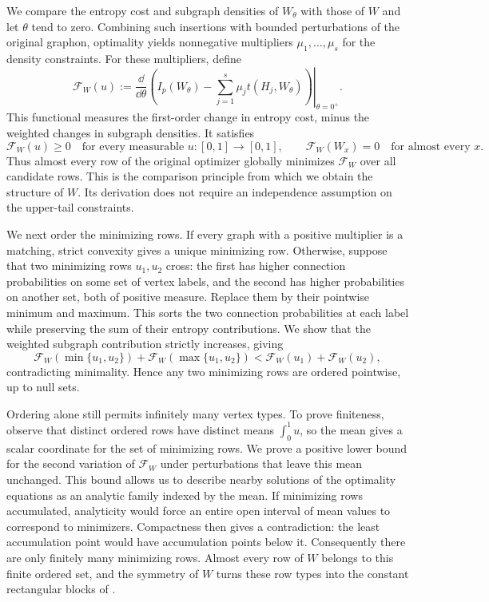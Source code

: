 We compare the entropy cost and subgraph densities of $W_\theta$ with
those of $W$ and let $\theta$ tend to zero. Combining such insertions
with bounded perturbations of the original graphon, optimality yields
nonnegative multipliers $\mu_1,\dots,\mu_s$ for the density constraints.
For these multipliers, define
\[
  \mathcal F_W(u):=\left.\frac{\dd}{\dd\theta}
  \left(I_p(W_\theta)-\sum_{j=1}^s\mu_j t(H_j,W_\theta)\right)
  \right|_{\theta=0^+}.
\]
This functional measures the first-order change in entropy cost,
minus the weighted changes in subgraph densities. It satisfies
\[
  \mathcal F_W(u)\ge0\quad\text{for every measurable }u:[0,1]\to[0,1],
  \qquad \mathcal F_W(W_x)=0\quad\text{for almost every }x.
\]
Thus almost every row of the original optimizer globally minimizes
$\mathcal F_W$ over all candidate rows. This is the comparison principle
from which we obtain the structure of $W$. Its derivation does not
require an independence assumption on the upper-tail constraints.

We next order the minimizing rows. If every graph with a positive
multiplier is a matching, strict convexity gives a unique minimizing
row. Otherwise, suppose that two minimizing rows $u_1,u_2$ cross: the
first has higher connection probabilities on some set of vertex labels,
and the second has higher probabilities on another set, both of
positive measure. Replace them by their pointwise minimum and maximum.
This sorts the two connection probabilities at each label while
preserving the sum of their entropy contributions. We show that the
weighted subgraph contribution strictly increases, giving
\[
  \mathcal F_W(\min\{u_1,u_2\})+\mathcal F_W(\max\{u_1,u_2\})
  <\mathcal F_W(u_1)+\mathcal F_W(u_2),
\]
contradicting minimality. Hence any two minimizing rows are ordered
pointwise, up to null sets.

Ordering alone still permits infinitely many vertex types. To prove
finiteness, observe that distinct ordered rows have distinct means
$\int_0^1u$, so the mean gives a scalar coordinate for the set of
minimizing rows. We prove a positive lower bound for the second variation
of $\mathcal F_W$ under perturbations that leave this mean unchanged.
This bound allows us to describe nearby solutions of the optimality
equations as an analytic family indexed by the mean. If minimizing rows
accumulated, analyticity would force an entire open interval of mean
values to correspond to minimizers. Compactness then gives a
contradiction: the least accumulation point would have accumulation
points below it. Consequently there are only finitely many minimizing
rows. Almost every row of $W$ belongs to this finite ordered set, and
the symmetry of $W$ turns these row types into the constant rectangular
blocks of .


